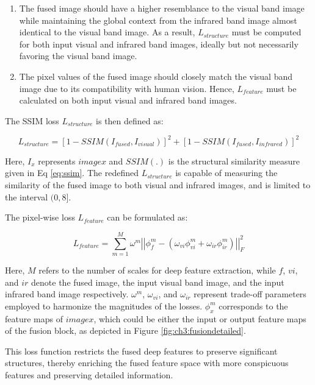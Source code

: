 \begin{enumerate}
    \item The fused image should have a higher resemblance to the visual band image while maintaining the global context from the infrared band image almost identical to the visual band image. As a result, $L_{structure}$ must be computed for both input visual and infrared band images, ideally but not necessarily favoring the visual band image.
    \item The pixel values of the fused image should closely match the visual band image due to its compatibility with human vision. Hence, $L_{feature}$ must be calculated on both input visual and infrared band images.
\end{enumerate}

The SSIM loss $L_{structure}$ is then defined as:

\begin{equation} \label{eq:fusessimloss}
    L_{structure} = \left[1- SSIM(I_{fused},I_{visual})\right]^2 + \left[1- SSIM(I_{fused},I_{infrared})\right]^2
\end{equation}

Here, $I_x$ represents $image x$ and $SSIM(.)$ is the structural similarity measure \cite{ma2015perceptual} given in Eq \ref{eq:ssim}. The redefined $L_{structure}$ is capable of measuring the similarity of the fused image to both visual and infrared images, and is limited to the interval $(0,8]$.

The pixel-wise loss $L_{feature}$ can be formulated as:

\begin{equation} \label{eq:fusepixelloss}
    L_{feature} = \sum_{m=1}^{M} \omega^m \left\lvert \left\lvert \phi_f^m - \left(\omega_{vi}\phi_{vi}^{m} + \omega_{ir}\phi_{ir}^{m}\right) \right\rvert \right\rvert _{F}^{2}
\end{equation}

Here, $M$ refers to the number of scales for deep feature extraction, while $f$, $vi$, and $ir$ denote the fused image, the input visual band image, and the input infrared band image respectively. $\omega^m$, $\omega_{vi}$, and $\omega_{ir}$ represent trade-off parameters employed to harmonize the magnitudes of the losses. $\phi_{x}^{m}$ corresponds to the feature maps of $image x$, which could be either the input or output feature maps of the fusion block, as depicted in Figure \ref{fig:ch3:fusiondetailed}.

This loss function restricts the fused deep features to preserve significant structures, thereby enriching the fused feature space with more conspicuous features and preserving detailed information.